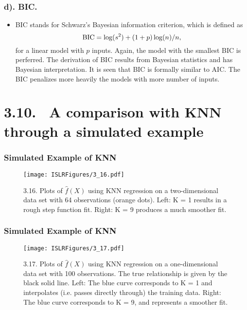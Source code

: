 \documentclass{beamer}
\begin{document}
      \begin{frame}
      	\frametitle{ d). BIC. }
      	\begin{itemize}
      		
      		\item  BIC stands for Schwarz's Bayesian information criterion, which is defined as
      		$$\hbox{BIC} =   \log(s^2) +  (1+p)\log(n)/n, $$
      		for a linear model with $p$ inputs.
      		Again, the model with the smallest BIC is perferred. The derivation of
      		BIC results from Bayesian statistics and has Bayesian interpretation.
      		It is seen that BIC is formally similar to AIC. The BIC penalizes more heavily
      		the models with more number of inputs.
      		
      		
      	\end{itemize}
      \end{frame}
      
      \section{3.10. \ A comparison with KNN through a simulated example}
      
      
      \begin{frame}
      	\frametitle{Simulated Example of KNN}
      	
      	\begin{figure}[h]
      		\centering
      		\texttt{[image: ISLRFigures/3\_16.pdf]}	 
      	
      	\caption{ \small 3.16. Plots of  $\hat f (X)$ using KNN regression on a two-dimensional data
      		set with 64 observations (orange dots). Left: K = 1 results in a rough step function
      		fit. Right: K = 9 produces a much smoother fit. }
      	\end{figure}
      \end{frame}
      
      
      
      \begin{frame}
      	\frametitle{Simulated Example of KNN}
      	
      	\begin{figure}[h]
      		\centering
      		\texttt{[image: ISLRFigures/3\_17.pdf]}	 
      
      	\caption{\small 3.17. Plots of $\hat f(X)$  using KNN regression on a one-dimensional data
      		set with 100 observations. The true relationship is given by the black solid line.
      		Left: The blue curve corresponds to K = 1 and interpolates (i.e. passes directly
      		through) the training data. Right: The blue curve corresponds to K = 9, and
      		represents a smoother fit. }
      		\end{figure}
      \end{frame}
      
\end{document}
